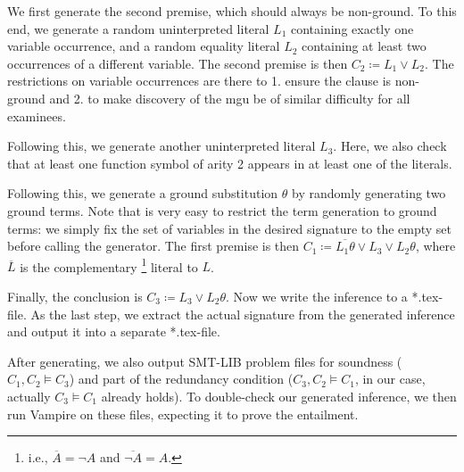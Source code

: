 We first generate the second premise, which should always be non-ground.
To this end, we generate a random uninterpreted literal $L_1$ containing exactly one variable occurrence,
and a random equality literal $L_2$ containing at least two occurrences of a different variable.
The second premise is then $C_2 \coloneqq L_1 \lor L_2$.
The restrictions on variable occurrences are there to 1. ensure the clause is non-ground
and 2. to make discovery of the mgu be of similar difficulty for all examinees.

Following this, we generate another uninterpreted literal $L_3$.
Here, we also check that at least one function symbol of arity 2 appears in at least one of the literals.

Following this, we generate a ground substitution $\theta$ by randomly generating two ground terms.
Note that is very easy to restrict the term generation to ground terms:
we simply fix the set of variables in the desired signature to the empty set before calling the generator.
The first premise is then $C_1 \coloneqq \overline{L_1\theta} \lor L_3 \lor L_2\theta$,
where $\overline{L}$ is the complementary%
\footnote{i.e., $\overline{A} = \lnot A$ and $\overline{\lnot A} = A$.}
literal to $L$.

Finally, the conclusion is $C_3 \coloneqq L_3 \lor L_2\theta$.
Now we write the inference to a *.tex-file.
As the last step,
we extract the actual signature from the generated inference and output it into a separate *.tex-file.

After generating, we also output SMT-LIB problem files for
soundness ($C_1, C_2 \models C_3$)
and part of the redundancy condition
($C_3, C_2 \models C_1$, in our case, actually $C_3 \models C_1$ already holds).
To double-check our generated inference, we then run Vampire on these files,
expecting it to prove the entailment.
